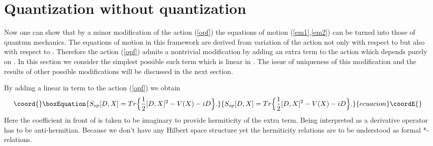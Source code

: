 \documentclass[a4paper,11pt]{article}
\begin{document}
\section{Quantization without quantization} \label{sec3}

Now one can show that by a minor modification of the action
(\ref{opf}) the equations of motion (\ref{em1},\ref{em2}) can be
turned into those of quantum mechanics. The equations of motion in
this framework  are derived from variation of the action not only
with respect to \coordHE{} but also with respect to \coordHE{}. Therefore the
action (\ref{opf}) admits a nontrivial modification by adding an
extra term to the action which depends purely on \coordHE{}. In this
section we consider the simplest possible such term which is
linear in \coordHE{}. The issue of uniqueness of this modification and
the results of other possible modifications will be discussed in
the next section.

By adding a linear in \coordHE{} term to the action (\ref{opf}) we obtain
\begin{equation}\coord{}\boxEquation{
S_{op}[D,X]=Tr \Big\{ \frac{1}{2}[D,X]^2 - V(X)-iD    \Big\}.
\label{opfql}
}{
S_{op}[D,X]=Tr \Big\{ \frac{1}{2}[D,X]^2 - V(X)-iD    \Big\}.
}{ecuacion}\coordE{}\end{equation}
Here the coefficient in front of \coordHE{} is taken to be imaginary to
provide hermiticity of the extra term. Being interpreted as a
derivative operator \coordHE{} has to be anti-hermitian. Because we don't
have any Hilbert space structure yet the hermiticity relations are
to be understood as formal *-relations.
\end{document}
